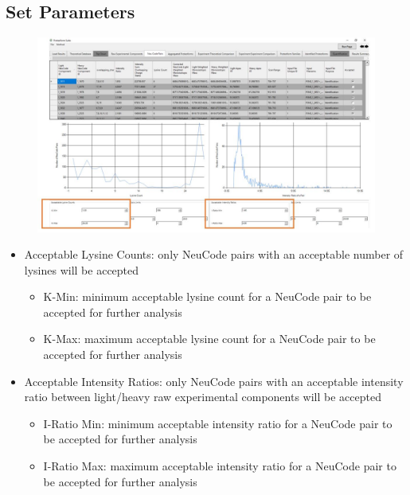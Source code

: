 \subsection{Set Parameters}
\begin{figure}[h]
\centering
\includegraphics[scale=0.43]{figures/neucode1.jpg}
\end{figure}
\begin{itemize}
\item Acceptable Lysine Counts: only NeuCode pairs with an acceptable number of lysines will be accepted
\begin{itemize}
\item K-Min: minimum acceptable lysine count for a NeuCode pair to be accepted for further analysis
\item K-Max: maximum acceptable lysine count for a NeuCode pair to be accepted for further analysis
\end{itemize}
\item Acceptable Intensity Ratios: only NeuCode pairs with an acceptable intensity ratio between light/heavy raw experimental components will be accepted
\begin{itemize}
\item I-Ratio Min: minimum acceptable intensity ratio for a NeuCode pair to be accepted for further analysis
\item I-Ratio Max: maximum acceptable intensity ratio for a NeuCode pair to be accepted for further analysis
\end{itemize}
\end{itemize}

